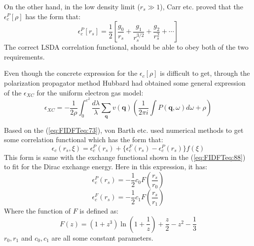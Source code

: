 On the other hand, in the low density limit ($r_{s} \gg 1$), Carr
etc.\cite{PhysRev.122.1437, coldwell-horsfall:395} proved that the
$\epsilon_{c}^{P}[\rho]$ has the form that:
\begin{equation}
  \label{eq:FIDFTeq:72}
  \epsilon_{c}^{P}[r_{s}] = \frac{1}{2}\left[\frac{g_{0}}{r_{s}} +
                      \frac{g_{1}}{r_{s}^{3/2}} +
                      \frac{g_{2}}{r_{s}^{2}} + \cdots \right]
\end{equation}
The correct LSDA correlation functional,
should be able to obey both of the two requirements.

Even though the concrete expression for the $\epsilon_{c}[\rho]$ is
difficult to get, through the polarization propagator method
Hubbard\cite{1958_Hubbard_Expression_EXC} had obtained some general
expression of the $\epsilon_{XC}$ for the uniform electron gas
model:
\begin{equation}
  \label{eq:FIDFTeq:73}
  \epsilon_{XC} =
  -\frac{1}{2\rho}\int_{0}^{e^{2}}\frac{d\lambda}{\lambda}
\sum_{\mathbf{q}}v(\mathbf{q}) \left(\frac{1}{2\pi i}\int
P(\mathbf{q}, \omega)d\omega + \rho \right)
\end{equation}

Based on the (\ref{eq:FIDFTeq:73}), von Barth
etc.\cite{1972JPhC....5.1629V} used numerical methods to get some
correlation functional which has the form that:
\begin{equation}\label{eq:FIDFTeq:89}
\epsilon_{c}(r_{s}, \xi) = \epsilon_{c}^{P}(r_{s}) + \{
\epsilon_{c}^{F}(r_{s}) - \epsilon_{c}^{P}(r_{s}) \}f(\xi)
\end{equation}
This form is same with the exchange functional shown in the
(\ref{eq:FIDFTeq:88}) to fit for the Dirac exchange energy. Here in
this expression, it has:
\begin{equation}
  \label{eq:FIDFTeq:74}
   \epsilon_{c}^{P}(r_{s}) = -\frac{1}{2}c_{0} F\left(\frac{r_{s}}{r_{0}}
\right)
\end{equation}
\begin{equation}
   \epsilon_{c}^{F}(r_{s}) = -\frac{1}{2}c_{1} F\left(\frac{r_{s}}{r_{1}}
\right)
\end{equation}
Where the function of $F$ is defined as:
\begin{equation}
  \label{eq:FIDFTeq:75}
 F(z) = (1+z^{3})\ln (1+ \frac{1}{z}) + \frac{z}{2} - z^{2} - \frac{1}{3}
\end{equation}
$r_{0}, r_{1}$ and $c_{0}, c_{1}$ are all some constant parameters.

